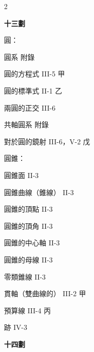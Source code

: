 \begin{multicols}{2}
\vspace{0.8em}
\begin{center}
\textbf{\large 十三劃}
\end{center}

\noindent 圓：\par
\noindent\hspace*{1.5em} 圓系 \hfill 附錄\par
\noindent\hspace*{1.5em} 圓的方程式 \hfill III-5 甲\par
\noindent\hspace*{1.5em} 圓的標準式 \hfill II-1 乙\par
\noindent\hspace*{1.5em} 兩圓的正交 \hfill III-6\par
\noindent\hspace*{1.5em} 共軸圓系 \hfill 附錄\par
\noindent\hspace*{1.5em} 對於圓的鏡射 \hfill III-6，V-2 戊\par
\noindent 圓錐：\par
\noindent\hspace*{1.5em} 圓錐面 \hfill II-3\par
\noindent\hspace*{1.5em} 圓錐曲線（錐線） \hfill II-3\par
\noindent\hspace*{1.5em} 圓錐的頂點 \hfill II-3\par
\noindent\hspace*{1.5em} 圓錐的頂角 \hfill II-3\par
\noindent\hspace*{1.5em} 圓錐的中心軸 \hfill II-3\par
\noindent\hspace*{1.5em} 圓錐的母線 \hfill II-3\par
\noindent 零類錐線 \hfill II-3\par
\noindent 貫軸（雙曲線的） \hfill III-2 甲\par
\noindent 預算線 \hfill III-4 丙\par
\noindent 跡 \hfill IV-3\par

\vspace{0.8em}
\begin{center}
\textbf{\large 十四劃}
\end{center}


\end{multicols}
